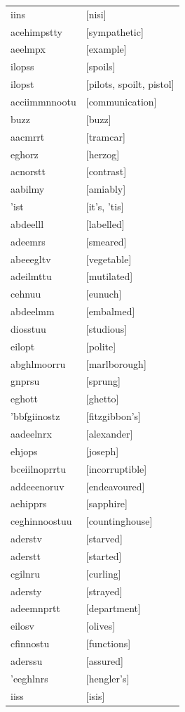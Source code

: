 \documentclass{article}
\begin{document}
\begin{tabular}{ll}
iins & [nisi] \\
acehimpstty & [sympathetic] \\
aeelmpx & [example] \\
ilopss & [spoils] \\
ilopst & [pilots, spoilt, pistol] \\
acciimmnnootu & [communication] \\
buzz & [buzz] \\
aacmrrt & [tramcar] \\
eghorz & [herzog] \\
acnorstt & [contrast] \\
aabilmy & [amiably] \\
'ist & [it's, 'tis] \\
abdeelll & [labelled] \\
adeemrs & [smeared] \\
abeeegltv & [vegetable] \\
adeilmttu & [mutilated] \\
cehnuu & [eunuch] \\
abdeelmm & [embalmed] \\
diosstuu & [studious] \\
eilopt & [polite] \\
abghlmoorru & [marlborough] \\
gnprsu & [sprung] \\
eghott & [ghetto] \\
'bbfgiinostz & [fitzgibbon's] \\
aadeelnrx & [alexander] \\
ehjops & [joseph] \\
bceiilnoprrtu & [incorruptible] \\
addeeenoruv & [endeavoured] \\
aehipprs & [sapphire] \\
ceghinnoostuu & [countinghouse] \\
aderstv & [starved] \\
aderstt & [started] \\
cgilnru & [curling] \\
adersty & [strayed] \\
adeemnprtt & [department] \\
eilosv & [olives] \\
cfinnostu & [functions] \\
aderssu & [assured] \\
'eeghlnrs & [hengler's] \\
iiss & [isis] \\

\end{tabular}
\end{document}
